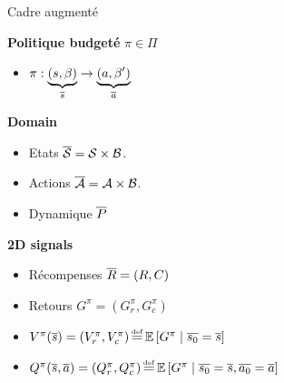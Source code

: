 \documentclass[french]{beamer}
\begin{document}
    \begin{frame}{Cadre augmenté}

        \textbf{Politique budgeté} $\pi\in\Pi$
        \begin{itemize}
            \item $ \pi:\underbrace{(s,\beta)}_{\overline{s}} \rightarrow \underbrace{(a,\beta')}_{\overline{a}}$
        \end{itemize}

        \textbf{Domain}
        \begin{itemize}
            \item Etats $\overline{\mathcal{S}} = \mathcal{S}\times\mathcal{B}$.
            \item Actions $\overline{\mathcal{A}} = \mathcal{A}\times\mathcal{B}$.
            \item Dynamique $\overline{P}$
        \end{itemize}
        \textbf{2D signals}
        \begin{itemize}
            \item Récompenses $\overline{R} = (R, C)$
            \item Retours $G^\pi = (G_r^\pi, G_c^\pi)$
            \item $V^\pi(\os) = (V_r^\pi, V_c^\pi) \eqdef \expectedvalue\left[ G^\pi \condbar \ov{s_0} = \os\right]$
            \item $Q^\pi(\os, \oa)= (Q_r^\pi, Q_c^\pi) \eqdef \expectedvalue\left[ G^\pi \condbar \ov{s_0} = \os, \ov{a_0} = \oa\right]$
        \end{itemize}

    \end{frame}
\end{document}
